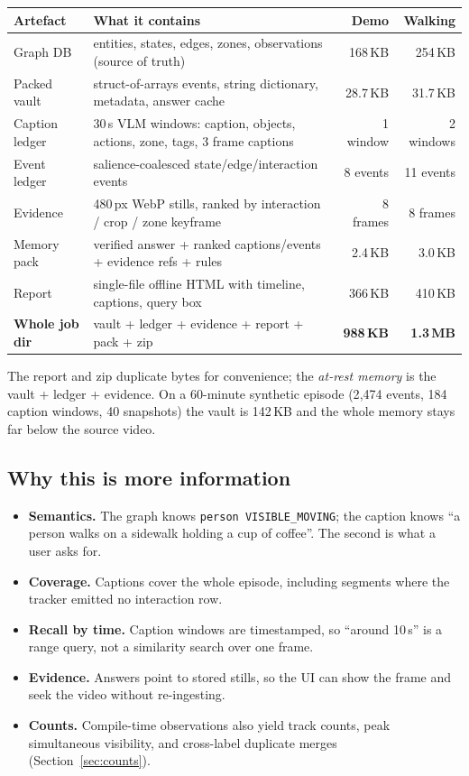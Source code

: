 \documentclass[10pt,a4paper]{article}
\newcommand{\code}[1]{\texttt{\small #1}}
\begin{document}
\begin{center}
\small
\begin{tabularx}{\linewidth}{@{}l X r r@{}}
\toprule
\textbf{Artefact} & \textbf{What it contains} & \textbf{Demo} & \textbf{Walking} \\
\midrule
Graph DB & entities, states, edges, zones, observations (source of truth) & 168\,KB & 254\,KB \\
Packed vault & struct-of-arrays events, string dictionary, metadata, answer cache & 28.7\,KB & 31.7\,KB \\
Caption ledger & 30\,s VLM windows: caption, objects, actions, zone, tags, 3 frame captions & 1 window & 2 windows \\
Event ledger & salience-coalesced state/edge/interaction events & 8 events & 11 events \\
Evidence & 480\,px WebP stills, ranked by interaction / crop / zone keyframe & 8 frames & 8 frames \\
Memory pack & verified answer + ranked captions/events + evidence refs + rules & 2.4\,KB & 3.0\,KB \\
Report & single-file offline HTML with timeline, captions, query box & 366\,KB & 410\,KB \\
\midrule
\textbf{Whole job dir} & vault + ledger + evidence + report + pack + zip & \textbf{988\,KB} & \textbf{1.3\,MB} \\
\bottomrule
\end{tabularx}
\end{center}

\noindent
The report and zip duplicate bytes for convenience; the \emph{at-rest memory} is the vault +
ledger + evidence. On a 60-minute synthetic episode (2{,}474 events, 184 caption windows, 40
snapshots) the vault is 142\,KB and the whole memory stays far below the source video.

\subsection{Why this is more information}

\begin{itemize}[leftmargin=1.25em,itemsep=1pt]
  \item \textbf{Semantics.} The graph knows \code{person VISIBLE\_MOVING}; the caption knows
        ``a person walks on a sidewalk holding a cup of coffee''. The second is what a user asks
        for.
  \item \textbf{Coverage.} Captions cover the whole episode, including segments where the tracker
        emitted no interaction row.
  \item \textbf{Recall by time.} Caption windows are timestamped, so ``around 10\,s'' is a range
        query, not a similarity search over one frame.
  \item \textbf{Evidence.} Answers point to stored stills, so the UI can show the frame and seek
        the video without re-ingesting.
  \item \textbf{Counts.} Compile-time observations also yield track counts, peak simultaneous
        visibility, and cross-label duplicate merges (Section~\ref{sec:counts}).
\end{itemize}
\end{document}
